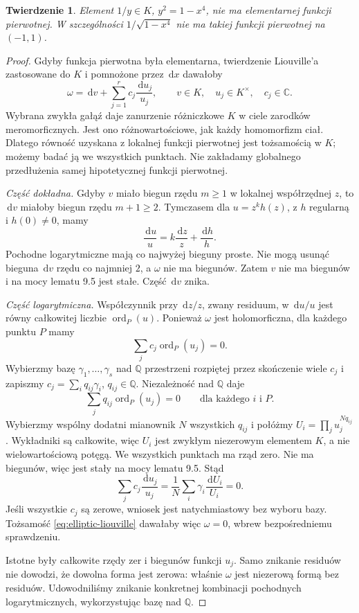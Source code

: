 \documentclass[11pt,a4paper,oneside]{book}
\numberwithin{equation}{section}
\theoremstyle{plain}
\newtheorem{twierdzenie}{Twierdzenie}[chapter]
\theoremstyle{definition}
\theoremstyle{remark}
\newcommand{\Q}{\mathbb{Q}}
\newcommand{\C}{\mathbb{C}}
\newcommand{\ord}{\operatorname{ord}}
\newcommand{\dd}{\,\mathrm{d}}
\begin{document}
\begin{twierdzenie}
Element $1/y\in K$, $y^2=1-x^4$, nie ma elementarnej funkcji pierwotnej. W szczególności $1/\sqrt{1-x^4}$ nie ma takiej funkcji pierwotnej na $(-1,1)$.
\end{twierdzenie}
\begin{proof}
Gdyby funkcja pierwotna była elementarna, twierdzenie Liouville'a zastosowane do $K$ i pomnożone przez $\dd x$ dawałoby
\begin{equation}\label{eq:elliptic-liouville}
\omega=\dd v+\sum_{j=1}^r c_j\frac{\dd u_j}{u_j},\qquad
v\in K,\quad u_j\in K^\times,\quad c_j\in\C.
\end{equation}
Wybrana zwykła gałąź daje zanurzenie różniczkowe $K$ w ciele zarodków meromorficznych. Jest ono różnowartościowe, jak każdy homomorfizm ciał. Dlatego równość uzyskana z lokalnej funkcji pierwotnej jest tożsamością w $K$; możemy badać ją we wszystkich punktach. Nie zakładamy globalnego przedłużenia samej hipotetycznej funkcji pierwotnej.

\emph{Część dokładna.} Gdyby $v$ miało biegun rzędu $m\ge1$ w lokalnej współrzędnej $z$, to $\dd v$ miałoby biegun rzędu $m+1\ge2$. Tymczasem dla $u=z^k h(z)$, z $h$ regularną i $h(0)\ne0$, mamy
\[
\frac{\dd u}{u}=k\frac{\dd z}{z}+\frac{\dd h}{h}.
\]
Pochodne logarytmiczne mają co najwyżej bieguny proste. Nie mogą usunąć bieguna $\dd v$ rzędu co najmniej $2$, a $\omega$ nie ma biegunów. Zatem $v$ nie ma biegunów i na mocy lematu 9.5 jest stałe. Część $\dd v$ znika.

\emph{Część logarytmiczna.} Współczynnik przy $\dd z/z$, zwany residuum, w $\dd u/u$ jest równy całkowitej liczbie $\ord_P(u)$. Ponieważ $\omega$ jest holomorficzna, dla każdego punktu $P$ mamy
\[
\sum_j c_j\ord_P(u_j)=0.
\]
Wybierzmy bazę $\gamma_1,\dots,\gamma_s$ nad $\Q$ przestrzeni rozpiętej przez skończenie wiele $c_j$ i zapiszmy $c_j=\sum_i q_{ij}\gamma_i$, $q_{ij}\in\Q$. Niezależność nad $\Q$ daje
\[
\sum_j q_{ij}\ord_P(u_j)=0\qquad\text{dla każdego }i\text{ i }P.
\]
Wybierzmy wspólny dodatni mianownik $N$ wszystkich $q_{ij}$ i połóżmy $U_i=\prod_j u_j^{Nq_{ij}}$. Wykładniki są całkowite, więc $U_i$ jest zwykłym niezerowym elementem $K$, a nie wielowartościową potęgą. We wszystkich punktach ma rząd zero. Nie ma biegunów, więc jest stały na mocy lematu 9.5. Stąd
\[
\sum_j c_j\frac{\dd u_j}{u_j}
=\frac1N\sum_i\gamma_i\frac{\dd U_i}{U_i}=0.
\]
Jeśli wszystkie $c_j$ są zerowe, wniosek jest natychmiastowy bez wyboru bazy. Tożsamość \eqref{eq:elliptic-liouville} dawałaby więc $\omega=0$, wbrew bezpośredniemu sprawdzeniu.

Istotne były całkowite rzędy zer i biegunów funkcji $u_j$. Samo znikanie residuów nie dowodzi, że dowolna forma jest zerowa: właśnie $\omega$ jest niezerową formą bez residuów. Udowodniliśmy znikanie konkretnej kombinacji pochodnych logarytmicznych, wykorzystując bazę nad $\Q$.
\end{proof}
\end{document}
